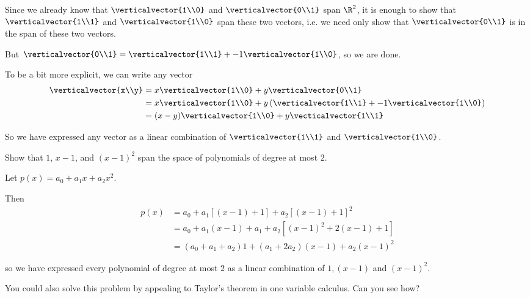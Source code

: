 \documentclass{ximera}
\begin{document}
\begin{free-response}
	Since we already know that $\verticalvector{1\\0}$ and $\verticalvector{0\\1}$ span $\R^2$,
	 it is enough to show that $\verticalvector{1\\1}$ and $\verticalvector{1\\0}$ span these two vectors, i.e.
	 we need only show that $\verticalvector{0\\1}$ is in the span of these two vectors.
	 
	 But $\verticalvector{0\\1} = \verticalvector{1\\1} +-1\verticalvector{1\\0}$, so we are done.
	 
	 To be a bit more explicit, we can write any vector \begin{align*}
	 \verticalvector{x\\y} &= x\verticalvector{1\\0}+ y\verticalvector{0\\1}\\
	 &= x\verticalvector{1\\0}+ y\left(\verticalvector{1\\1} +-1\verticalvector{1\\0}\right)\\
	 &=(x-y)\verticalvector{1\\0}+y\vecticalvector{1\\1}
	 \end{align*}
	 
	 So we have expressed any vector as a linear combination of $\verticalvector{1\\1}$ and $\verticalvector{1\\0}$.
\end{free-response} 

 
 	Show that $1$, $x-1$, and $(x-1)^2$  span the space of polynomials of degree at most $2$.

\begin{free-response}
	Let $p(x)=a_0+a_1x+a_2x^2$. 
	
	Then \begin{align*}
		p(x) &= a_0+a_1[(x-1)+1]+a_2[(x-1)+1]^2\\
			   &= a_0+a_1(x-1)+a_1+a_2[(x-1)^2+2(x-1)+1]\\
			   &= (a_0+a_1+a_2)1+(a_1+2a_2)(x-1)+a_2(x-1)^2
		\end{align*}
	
	so we have expressed every polynomial of degree at most $2$ as a linear combination of $1,(x-1)$ and $(x-1)^2$.
	
	You could also solve this problem by appealing to Taylor's theorem in one variable calculus.  Can you see how?
\end{free-response}
\end{document}
